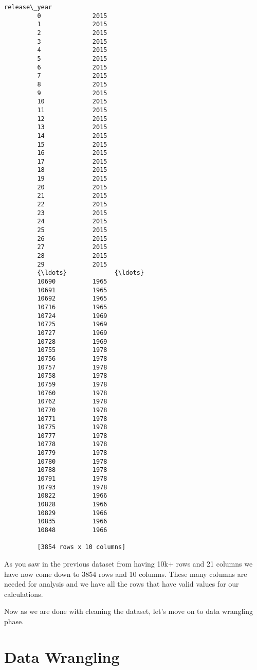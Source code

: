 \documentclass[11pt]{article}
\begin{document}
\begin{Verbatim}[commandchars=\\\{\}]
                release\_year  
         0              2015  
         1              2015  
         2              2015  
         3              2015  
         4              2015  
         5              2015  
         6              2015  
         7              2015  
         8              2015  
         9              2015  
         10             2015  
         11             2015  
         12             2015  
         13             2015  
         14             2015  
         15             2015  
         16             2015  
         17             2015  
         18             2015  
         19             2015  
         20             2015  
         21             2015  
         22             2015  
         23             2015  
         24             2015  
         25             2015  
         26             2015  
         27             2015  
         28             2015  
         29             2015  
         {\ldots}             {\ldots}  
         10690          1965  
         10691          1965  
         10692          1965  
         10716          1965  
         10724          1969  
         10725          1969  
         10727          1969  
         10728          1969  
         10755          1978  
         10756          1978  
         10757          1978  
         10758          1978  
         10759          1978  
         10760          1978  
         10762          1978  
         10770          1978  
         10771          1978  
         10775          1978  
         10777          1978  
         10778          1978  
         10779          1978  
         10780          1978  
         10788          1978  
         10791          1978  
         10793          1978  
         10822          1966  
         10828          1966  
         10829          1966  
         10835          1966  
         10848          1966  
         
         [3854 rows x 10 columns]
\end{Verbatim}
            
    As you saw in the previous dataset from having 10k+ rows and 21 columns
we have now come down to 3854 rows and 10 columns. These many columns
are needed for analysis and we have all the rows that have valid values
for our calculations.

Now as we are done with cleaning the dataset, let's move on to data
wrangling phase.

    \section{Data Wrangling}\label{data-wrangling}
\end{document}
